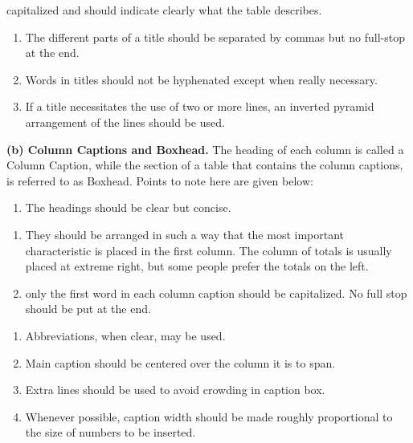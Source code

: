 \documentclass[]{article}
\providecommand{\tightlist}{%
  \setlength{\itemsep}{0pt}\setlength{\parskip}{0pt}}
\begin{document}
capitalized and should indicate clearly what the table describes.

\begin{enumerate}
\def\labelenumi{(\roman{enumi})}
\setcounter{enumi}{3}
\item
  The different parts of a title should be separated by commas but no
  full-stop at the end.
\item
  Words in titles should not be hyphenated except when really necessary.
\item
  If a title necessitates the use of two or more lines, an inverted
  pyramid arrangement of the lines should be used.
\end{enumerate}

\textbf{(b) Column Captions and Boxhead.} The heading of each column is
called a Column Caption, while the section of a table that contains the
column captions, is referred to as Boxhead. Points to note here are
given below:

\begin{enumerate}
\def\labelenumi{(\roman{enumi})}
\tightlist
\item
  The headings should be clear but concise.
\end{enumerate}

\begin{enumerate}
\def\labelenumi{\roman{enumi})}
\setcounter{enumi}{1}
\item
  They should be arranged in such a way that the most important
  characteristic is placed in the first column. The column of totals is
  usually placed at extreme right, but some people prefer the totals on
  the left.
\item
  only the first word in each column caption should be capitalized. No
  full stop should be put at the end.
\end{enumerate}

\begin{enumerate}
\def\labelenumi{(\roman{enumi})}
\setcounter{enumi}{3}
\item
  Abbreviations, when clear, may be used.
\item
  Main caption should be centered over the column it is to span.
\item
  Extra lines should be used to avoid crowding in caption box.
\item
  Whenever possible, caption width should be made roughly proportional
  to the size of numbers to be inserted.
\end{enumerate}
\end{document}
